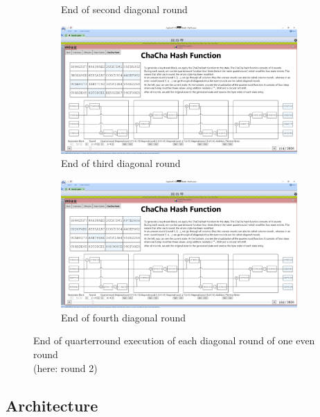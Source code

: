 \begin{figure}
\begin{subfigure}{0.5\textwidth}
  \caption{End of second diagonal round}
  \label{fig:chachahash.dr.2}
\end{subfigure}
\begin{subfigure}{0.5\textwidth}
  \centering
  \includegraphics[width=0.99\textwidth]{figures/ct2/chachahash/chachahash-dr3-end.png}
  \caption{End of third diagonal round}
  \label{fig:chachahash.dr.3}
\end{subfigure}%
\begin{subfigure}{0.5\textwidth}
  \centering
  \includegraphics[width=0.99\textwidth]{figures/ct2/chachahash/chachahash-dr4-end.png}
  \caption{End of fourth diagonal round}
  \label{fig:chachahash.dr.4}
\end{subfigure}
\caption[End of diagonal rounds]{End of quarterround execution of each diagonal round of one even round \\(here: round 2)}
\label{fig:chachahash.dr}
\end{figure}

\subsection{Architecture}
\label{sec:Architecture}


